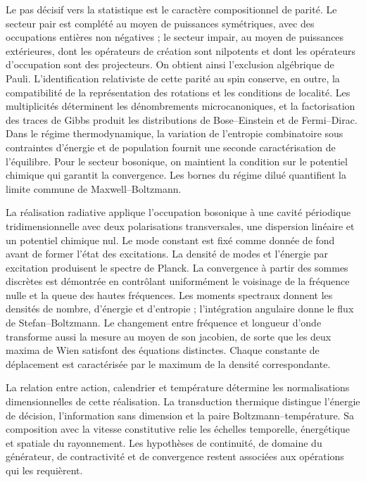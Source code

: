 Le pas décisif vers la statistique est le caractère compositionnel de
parité. Le secteur pair est complété au moyen de puissances symétriques, avec
des occupations entières non négatives ; le secteur impair, au moyen de puissances
extérieures, dont les opérateurs de création sont nilpotents et dont les
opérateurs d’occupation sont des projecteurs. On obtient ainsi
l’exclusion algébrique de Pauli. L’identification relativiste de cette
parité au spin conserve, en outre, la compatibilité de la
représentation des rotations et les conditions de localité. Les multiplicités déterminent les dénombrements microcanoniques, et la
factorisation des traces de Gibbs produit les distributions de
Bose--Einstein et de Fermi--Dirac. Dans le régime thermodynamique, la variation
de l’entropie combinatoire sous contraintes d’énergie et de population
fournit une seconde caractérisation de l’équilibre. Pour le secteur bosonique, on maintient la
condition sur le potentiel chimique qui garantit la convergence.
Les bornes du régime dilué quantifient la limite commune de
Maxwell--Boltzmann.

La réalisation radiative applique l’occupation bosonique à une cavité
périodique tridimensionnelle avec deux polarisations transversales, une dispersion
linéaire et un potentiel chimique nul. Le mode constant est fixé comme donnée de
fond avant de former l’état des excitations. La densité de modes et
l’énergie par excitation produisent le spectre de Planck. La convergence
à partir des sommes discrètes est démontrée en contrôlant uniformément le
voisinage de la fréquence nulle et la queue des hautes fréquences. Les moments
spectraux donnent les densités de nombre, d’énergie et d’entropie ;
l’intégration angulaire donne le flux de Stefan--Boltzmann. Le changement entre
fréquence et longueur d’onde transforme aussi la mesure au moyen de son
jacobien, de sorte que les deux maxima de Wien satisfont des équations
distinctes. Chaque constante de déplacement est caractérisée par le
maximum de la densité correspondante.

La relation entre action, calendrier et température détermine les
normalisations dimensionnelles de cette réalisation. La transduction
thermique distingue l’énergie de décision, l’information sans dimension et
la paire Boltzmann--température. Sa composition avec la vitesse
constitutive relie les échelles temporelle, énergétique et spatiale du
rayonnement. Les hypothèses de continuité, de domaine du générateur,
de contractivité et de convergence restent associées aux opérations
qui les requièrent.

